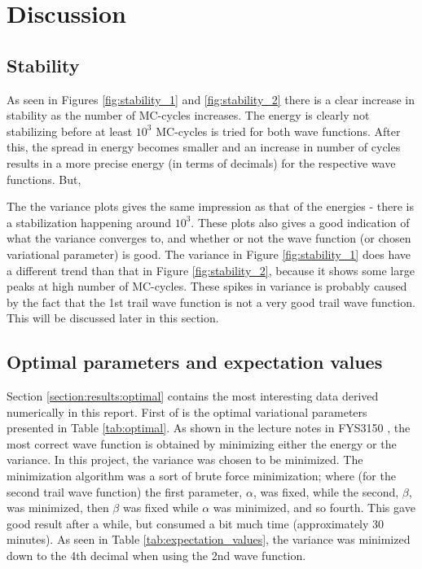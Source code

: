 \documentclass[12pt,english,a4paper]{article}
\begin{document}
\section{Discussion} \label{section:discussion}
\subsection{Stability} \label{section:discussion:stability}
As seen in Figures \ref{fig:stability_1} and \ref{fig:stability_2} there is a clear increase in stability as the number of MC-cycles increases. The energy is clearly not stabilizing before at least $10^3$ MC-cycles is tried for both wave functions. After this, the spread in energy becomes smaller and an increase in number of cycles results in a more precise energy (in terms of decimals) for the respective wave functions. But, 

The the variance plots gives the same impression as that of the energies - there is a stabilization happening around $10^3$. These plots also gives a good indication of what the variance converges to, and whether or not the wave function (or chosen variational parameter) is good. The variance in Figure \ref{fig:stability_1} does have a different trend than that in Figure \ref{fig:stability_2}, because it shows some large peaks at high number of MC-cycles. These spikes in variance is probably caused by the fact that the 1st trail wave function is not a very good trail wave function. This will be discussed later in this section.

\subsection{Optimal parameters and expectation values} \label{section:discussion:optimal}
Section \ref{section:results:optimal} contains the most interesting data derived numerically in this report. First of is the optimal variational parameters presented in Table \ref{tab:optimal}. As shown in the lecture notes in FYS3150 \cite{Lec15}, the most correct wave function is obtained by minimizing either the energy or the variance. In this project, the variance was chosen to be minimized. The minimization algorithm was a sort of brute force minimization; where (for the second trail wave function) the first parameter, $\alpha$, was fixed, while the second, $\beta$, was minimized, then $\beta$ was fixed while $\alpha$ was minimized, and so fourth. This gave good result after a while, but consumed a bit much time (approximately 30 minutes). As seen in Table \ref{tab:expectation_values}, the variance was minimized down to the 4th decimal when using the 2nd wave function.
\end{document}
